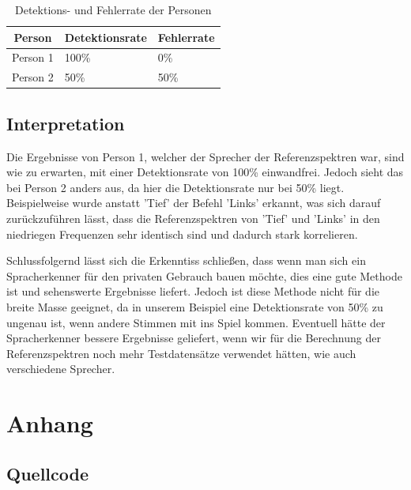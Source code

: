 \documentclass[12pt, oneside, a4paper, \docLanguage]{report}
\begin{document}
\begin{table}[H]
\centering
\begin{tabular}{|l|l|l|}
\hline
\multicolumn{1}{|c|}{\textbf{Person}} & \textbf{Detektionsrate} & \textbf{Fehlerrate} \\ \hline
Person 1     & 100\%         & 0\%       \\ \hline
Person 2     & 50\%         & 50\%       \\ \hline
\end{tabular}
\caption{Detektions- und Fehlerrate der Personen}
\label{fig:VERSUCH_2_rates}
\end{table}
\newpage
\section{Interpretation}
\label{chap:VERSUCH_2_INTERPRETATION}

Die Ergebnisse von Person 1, welcher der Sprecher der Referenzspektren war, sind wie zu erwarten, mit einer Detektionsrate von 100\% einwandfrei. Jedoch sieht das bei Person 2 anders aus, da hier die Detektionsrate nur bei 50\% liegt. Beispielweise wurde anstatt 'Tief' der Befehl 'Links' erkannt, was sich darauf zurückzuführen lässt, dass die Referenzspektren von 'Tief' und 'Links' in den niedriegen Frequenzen sehr identisch sind und dadurch stark korrelieren.

Schlussfolgernd lässt sich die Erkenntiss schließen, dass wenn man sich ein Spracherkenner für den privaten Gebrauch bauen möchte, dies eine gute Methode ist und sehenswerte Ergebnisse liefert. Jedoch ist diese Methode nicht für die breite Masse geeignet, da in unserem Beispiel eine Detektionsrate von 50\% zu ungenau ist, wenn andere Stimmen mit ins Spiel kommen. Eventuell hätte der Spracherkenner bessere Ergebnisse geliefert, wenn wir für die Berechnung der Referenzspektren noch mehr Testdatensätze verwendet hätten, wie auch verschiedene Sprecher.

%
%
\renewcommand\thesection{A.\arabic{section}}
\renewcommand\thesubsection{\thesection.\arabic{subsection}}

\chapter*{Anhang}
\label{chap:APPENDIX}
\addtocounter{chapter}{1}
\setcounter{section}{0}

\section{Quellcode}
\label{chap:APPENDIX_SOURCECODE}
\end{document}
